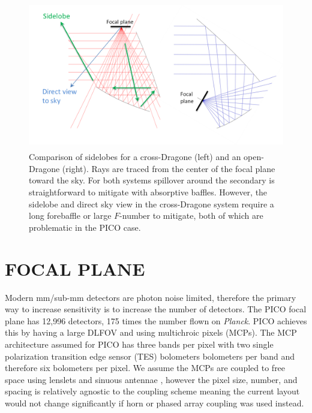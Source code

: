 \documentclass[]{spie}  %
\begin{document}
\begin{figure} [ht]
\begin{center}
\includegraphics[height=6.5cm]{sidelobes.png}
\end{center}
\caption { \label{fig:sidelobes} 
Comparison of sidelobes for a cross-Dragone (left) and an open-Dragone (right).  Rays are traced from the center 
of the focal plane toward the sky.
For both systems spillover around the secondary is straightforward to mitigate with absorptive baffles.  
However, the sidelobe and direct 
sky view in the cross-Dragone system require a long forebaffle or large $F$-number to mitigate, both of which are problematic in the PICO case.
}
\end{figure} 


\section{FOCAL PLANE}
\label{sec:focalplane}

Modern mm/sub-mm detectors are photon noise limited, therefore the primary way to increase sensitivity is to increase the number of detectors. 
The PICO focal plane has 12,996 detectors, 175 times the number flown on \textit{Planck}. PICO achieves this by 
having a large DLFOV and using multichroic pixels (MCPs)\cite{Suzuki2014_samps,datta2014_mcp}. 
The MCP architecture assumed for PICO has three bands per pixel with two single polarization transition 
edge sensor (TES) bolometers bolometers per band and therefore six bolometers per pixel. 
We assume the MCPs are coupled to free space using lenslets and sinuous antennae \cite{Suzuki2014_samps}, 
however the pixel size, number, and spacing is 
relatively agnostic to the coupling scheme meaning the current layout would not change significantly 
if horn or phased array coupling was used instead.
\end{document}

